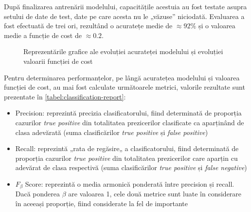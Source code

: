 După finalizarea antrenării modelului, capacitățile acestuia au fost testate asupra setului de date de test, date pe care acesta nu le „văzuse” niciodată. Evaluarea a fost efectuată de trei ori, rezultând o acuratețe medie de $\approx92\%$ și o valoarea medie a funcție de cost de $\approx0.2$.
\begin{figure}[H]
\centering
{}
\qquad
{}
\caption{Reprezentările grafice ale evoluției acurateței modelului \protect{} și evoluției valoarii funcției de cost \protect{}}\label{fig:acc+loss+graph}
\end{figure}

Pentru determinarea performanțelor, pe lângă acuratețea modelului și valoarea funcției de cost, au mai fost calculate următoarele metrici, valorile rezultate sunt prezentate în \autoref{tabel:classification-report}:
\begin{itemize}
\item Precision: reprezintă precizia clasificatorului, fiind determinată de proporția cazurilor \textit{true positive} din totalitatea prezicerilor clasificate ca aparținând de clasa adevărată (suma clasificărilor \textit{true positive} și \textit{false positive})
\item Recall: reprezintă „rata de regăsire„ a clasificatorului, fiind determinată de proporția cazurilor \textit{true positive} din totalitatea prezicerilor care aparțin cu adevărat de clasa respectivă (suma clasificărilor \textit{true positive} și \textit{false negative})
\item $F_\beta$ Score: reprezintă o media armonică ponderată între precision și recall. Dacă ponderea $\beta$ are valoarea 1, cele două metrice sunt luate în considerare în aceeași proporție, fiind considerate la fel de importante
\end{itemize}

